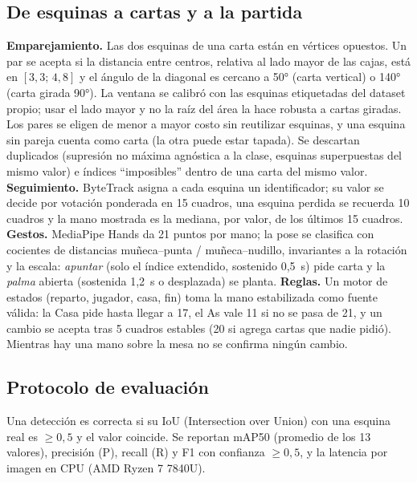 \documentclass[conference,a4paper]{IEEEtran}
\begin{document}
\subsection{De esquinas a cartas y a la partida}
\textbf{Emparejamiento.} Las dos esquinas de una carta están en vértices opuestos. Un par se acepta si la distancia
entre centros, relativa al lado mayor de las cajas, está en $[3{,}3;\,4{,}8]$ y el ángulo de la diagonal es cercano
a 50° (carta vertical) o 140° (carta girada 90°). La ventana se calibró con las esquinas etiquetadas del dataset
propio; usar el lado mayor y no la raíz del área la hace robusta a cartas giradas. Los pares se eligen de menor a mayor
costo sin reutilizar esquinas, y una esquina sin pareja cuenta como carta (la otra puede estar tapada). Se descartan
duplicados (supresión no máxima agnóstica a la clase, esquinas superpuestas del mismo valor) e índices ``imposibles''
dentro de una carta del mismo valor.
\textbf{Seguimiento.} ByteTrack \cite{zhang2022bytetrack} asigna a cada esquina un identificador; su valor se decide
por votación ponderada en 15 cuadros, una esquina perdida se recuerda 10 cuadros y la mano mostrada es la mediana, por
valor, de los últimos 15 cuadros.
\textbf{Gestos.} MediaPipe Hands \cite{zhang2020mediapipe} da 21 puntos por mano; la pose se clasifica con cocientes
de distancias muñeca--punta / muñeca--nudillo, invariantes a la rotación y la escala: \emph{apuntar} (solo el índice
extendido, sostenido 0,5~s) pide carta y la \emph{palma} abierta (sostenida 1,2~s o desplazada) se planta.
\textbf{Reglas.} Un motor de estados (reparto, jugador, casa, fin) toma la mano estabilizada como fuente válida: la
Casa pide hasta llegar a 17, el As vale 11 si no se pasa de 21, y un cambio se acepta tras 5 cuadros estables (20 si agrega
cartas que nadie pidió). Mientras hay una mano sobre la mesa no se confirma ningún cambio.

\subsection{Protocolo de evaluación}
Una detección es correcta si su IoU (Intersection over Union) con una esquina real es $\geq 0{,}5$ y el valor coincide. Se reportan mAP50
(promedio de los 13 valores), precisión (P), recall (R) y F1 con confianza $\geq 0{,}5$, y la latencia por imagen en
CPU (AMD Ryzen 7 7840U).
\end{document}
